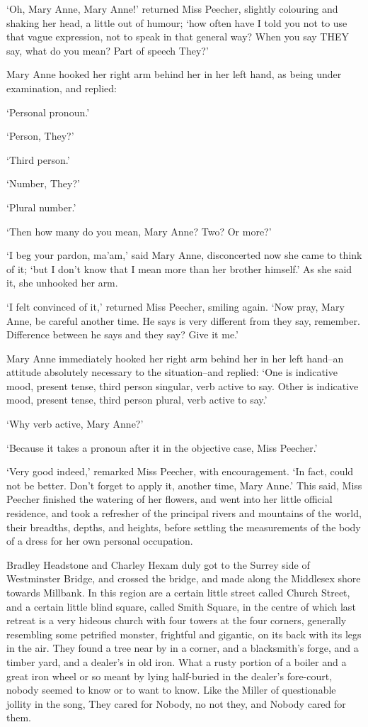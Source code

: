 ‘Oh, Mary Anne, Mary Anne!’ returned Miss Peecher, slightly colouring
and shaking her head, a little out of humour; ‘how often have I told you
not to use that vague expression, not to speak in that general way? When
you say THEY say, what do you mean? Part of speech They?’

Mary Anne hooked her right arm behind her in her left hand, as being
under examination, and replied:

‘Personal pronoun.’

‘Person, They?’

‘Third person.’

‘Number, They?’

‘Plural number.’

‘Then how many do you mean, Mary Anne? Two? Or more?’

‘I beg your pardon, ma’am,’ said Mary Anne, disconcerted now she came
to think of it; ‘but I don’t know that I mean more than her brother
himself.’ As she said it, she unhooked her arm.

‘I felt convinced of it,’ returned Miss Peecher, smiling again. ‘Now
pray, Mary Anne, be careful another time. He says is very different from
they say, remember. Difference between he says and they say? Give it
me.’

Mary Anne immediately hooked her right arm behind her in her left
hand--an attitude absolutely necessary to the situation--and replied:
‘One is indicative mood, present tense, third person singular, verb
active to say. Other is indicative mood, present tense, third person
plural, verb active to say.’

‘Why verb active, Mary Anne?’

‘Because it takes a pronoun after it in the objective case, Miss
Peecher.’

‘Very good indeed,’ remarked Miss Peecher, with encouragement. ‘In fact,
could not be better. Don’t forget to apply it, another time, Mary Anne.’
This said, Miss Peecher finished the watering of her flowers, and
went into her little official residence, and took a refresher of the
principal rivers and mountains of the world, their breadths, depths, and
heights, before settling the measurements of the body of a dress for her
own personal occupation.

Bradley Headstone and Charley Hexam duly got to the Surrey side of
Westminster Bridge, and crossed the bridge, and made along the Middlesex
shore towards Millbank. In this region are a certain little street
called Church Street, and a certain little blind square, called Smith
Square, in the centre of which last retreat is a very hideous church
with four towers at the four corners, generally resembling some
petrified monster, frightful and gigantic, on its back with its legs
in the air. They found a tree near by in a corner, and a blacksmith’s
forge, and a timber yard, and a dealer’s in old iron. What a rusty
portion of a boiler and a great iron wheel or so meant by lying
half-buried in the dealer’s fore-court, nobody seemed to know or to want
to know. Like the Miller of questionable jollity in the song, They cared
for Nobody, no not they, and Nobody cared for them.

